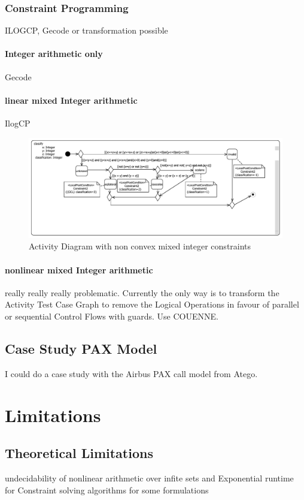 \subsubsection{Constraint Programming}
ILOGCP, Gecode or transformation possible
\paragraph{Integer arithmetic only} Gecode
\paragraph{linear mixed Integer arithmetic} IlogCP
\begin{figure}
\label{fig:classifyTriangle}
\includegraphics[width=\textwidth]{./pics/TriangleClassificator.pdf}
\caption{Activity Diagram with non convex mixed integer constraints}
\end{figure}
\paragraph{nonlinear mixed Integer arithmetic}
really really really problematic. Currently the only way is to transform the Activity Test Case Graph to remove the Logical Operations in favour of parallel or sequential Control Flows with guards. Use COUENNE.
\subsection{Case Study PAX Model}
\label{sec:evaluationCaseStudy}
I could do a case study with the Airbus PAX call model from Atego.
\section{Limitations}
\label{sec:evaluationLimitations}
\subsection{Theoretical Limitations}
undecidability of nonlinear arithmetic over infite sets and Exponential runtime for Constraint solving algorithms for some formulations
